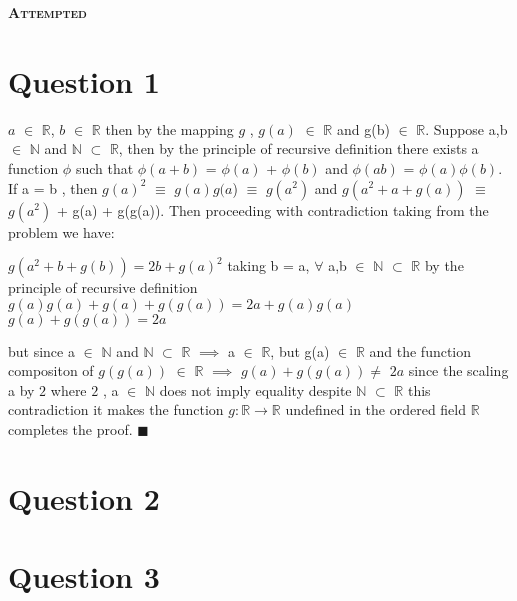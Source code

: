 \documentclass[a4paper, 12pt]{article}
\begin{document}
\begin{center}
    \fontsize{24pt}{10pt}\selectfont
    \textsc{\textbf{Attempted}}
\end{center}

\section{Question 1}
$a$  $\in$  $\mathbb{R}$, $b$  $\in$  $\mathbb{R}$ then by  the mapping $g$ , $g(a)$  $\in$ $\mathbb{R}$ and
g(b) $\in$ $\mathbb{R}$. Suppose a,b $\in$ $\mathbb{N}$ and $\mathbb{N}$ $\subset$ $\mathbb{R}$, 
then by the principle of recursive definition there exists a function $\phi$ such that
$\phi(a + b)$ = $\phi(a)$ + $\phi(b)$ and $\phi(ab)$ = $\phi(a)\phi(b)$.
If a = b , then $g(a)^2$ $\equiv$ $g(a)g(a$) $\equiv$ $g(a^2)$  and $g(a^2 + a + g(a))$ $\equiv$ $g(a^2)$ + g(a) + g(g(a)).
Then proceeding with contradiction taking from the problem we have:
\begin{center}
    $g(a^2 + b + g(b)) = 2b + g(a)^2$
    taking b = a, $\forall$ a,b $\in$ $\mathbb{N}$ $\subset$ $\mathbb{R}$
    by the principle of recursive definition
    $g(a)g(a) + g(a) + g(g(a)) = 2a + g(a)g(a)$
    $g(a) + g(g(a)) = 2a$
\end{center}
but since a $\in$ $\mathbb{N}$ and $\mathbb{N}$ $\subset$ $\mathbb{R}$ $\implies $ a $\in$ $\mathbb{R}$, 
but g(a) $\in$ $\mathbb{R}$ and the function compositon of $g(g(a))$ $\in$ $\mathbb{R}$ $\implies $ $g(a) + g(g(a))\neq$ $2a$
since the scaling a by $2$ where $2$ , a $\in$ $\mathbb{N}$ does not imply equality despite $\mathbb{N}$ $\subset$ $\mathbb{R}$ 
this contradiction it makes the function $g:\mathbb{R}\longrightarrow \mathbb{R}$ undefined in the ordered field $\mathbb{R}$ completes the proof. $\blacksquare$ 

\newpage

\section{Question 2}

\newpage

\section{Question 3}
\end{document}
